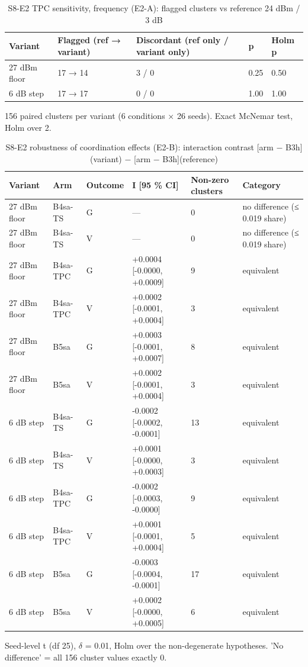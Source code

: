 \begin{table}[t]\centering\caption{S8-E2 TPC sensitivity, frequency (E2-A): flagged clusters vs reference 24 dBm / 3 dB}\label{tab:t8}\footnotesize
\begin{tabular}{lllll}\toprule
Variant & Flagged (ref → variant) & Discordant (ref only / variant only) & p & Holm p \\\midrule
27 dBm floor & 17 → 14 & 3 / 0 & 0.25 & 0.50 \\
6 dB step & 17 → 17 & 0 / 0 & 1.00 & 1.00 \\
\bottomrule\end{tabular}
\par\smallskip\parbox{\linewidth}{\scriptsize 156 paired clusters per variant (6 conditions × 26 seeds). Exact McNemar test, Holm over 2.}\end{table}

\begin{table}[t]\centering\caption{S8-E2 robustness of coordination effects (E2-B): interaction contrast [arm $-$ B3h](variant) $-$ [arm $-$ B3h](reference)}\label{tab:t9}\footnotesize
\begin{tabular}{llllll}\toprule
Variant & Arm & Outcome & I [95 \% CI] & Non-zero clusters & Category \\\midrule
27 dBm floor & B4sa-TS & G & — & 0 & no difference (≤ 0.019 share) \\
27 dBm floor & B4sa-TS & V & — & 0 & no difference (≤ 0.019 share) \\
27 dBm floor & B4sa-TPC & G & +0.0004 [-0.0000, +0.0009] & 9 & equivalent \\
27 dBm floor & B4sa-TPC & V & +0.0002 [-0.0001, +0.0004] & 3 & equivalent \\
27 dBm floor & B5sa & G & +0.0003 [-0.0001, +0.0007] & 8 & equivalent \\
27 dBm floor & B5sa & V & +0.0002 [-0.0001, +0.0004] & 3 & equivalent \\
6 dB step & B4sa-TS & G & -0.0002 [-0.0002, -0.0001] & 13 & equivalent \\
6 dB step & B4sa-TS & V & +0.0001 [-0.0000, +0.0003] & 3 & equivalent \\
6 dB step & B4sa-TPC & G & -0.0002 [-0.0003, -0.0000] & 9 & equivalent \\
6 dB step & B4sa-TPC & V & +0.0001 [-0.0001, +0.0004] & 5 & equivalent \\
6 dB step & B5sa & G & -0.0003 [-0.0004, -0.0001] & 17 & equivalent \\
6 dB step & B5sa & V & +0.0002 [-0.0000, +0.0005] & 6 & equivalent \\
\bottomrule\end{tabular}
\par\smallskip\parbox{\linewidth}{\scriptsize Seed-level t (df 25), $\delta$ = 0.01, Holm over the non-degenerate hypotheses. 'No difference' = all 156 cluster values exactly 0.}\end{table}
